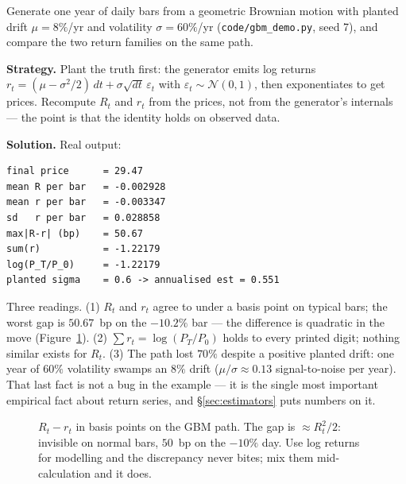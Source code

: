 \begin{example}\label{ex:gbm}
Generate one year of daily bars from a geometric Brownian motion with
planted drift $\mu=8\%$/yr and volatility $\sigma=60\%$/yr
(\texttt{code/gbm\_demo.py}, seed 7), and compare the two return
families on the same path.

\textbf{Strategy.} Plant the truth first: the generator emits log
returns $r_t = (\mu-\sigma^2/2)\,dt + \sigma\sqrt{dt}\,\varepsilon_t$
with $\varepsilon_t\sim\mathcal N(0,1)$, then exponentiates to get
prices. Recompute $R_t$ and $r_t$ from the prices, not from the
generator's internals --- the point is that the identity holds on
observed data.

\textbf{Solution.} Real output:
\begin{lstlisting}[numbers=none]
final price      = 29.47
mean R per bar   = -0.002928
mean r per bar   = -0.003347
sd   r per bar   = 0.028858
max|R-r| (bp)    = 50.67
sum(r)           = -1.22179
log(P_T/P_0)     = -1.22179
planted sigma    = 0.6 -> annualised est = 0.551
\end{lstlisting}
Three readings. (1) $R_t$ and $r_t$ agree to under a basis point on
typical bars; the worst gap is $50.67$~bp on the $-10.2\%$ bar ---
the difference is quadratic in the move (Figure~\ref{fig:simplelog}).
(2) $\sum r_t = \log(P_T/P_0)$ holds to every printed digit; nothing
similar exists for $R_t$. (3) The path lost $70\%$ despite a positive
planted drift: one year of $60\%$ volatility swamps an $8\%$ drift
($\mu/\sigma \approx 0.13$ signal-to-noise per year). That last fact
is not a bug in the example --- it is the single most important
empirical fact about return series, and \S\ref{sec:estimators} puts
numbers on it.
\end{example}

\begin{figure}[ht]\centering

\caption{$R_t - r_t$ in basis points on the GBM path. The gap is
$\approx R_t^2/2$: invisible on normal bars, $50$~bp on the
$-10\%$ day. Use log returns for modelling and the discrepancy never
bites; mix them mid-calculation and it does.}
\label{fig:simplelog}
\end{figure}

